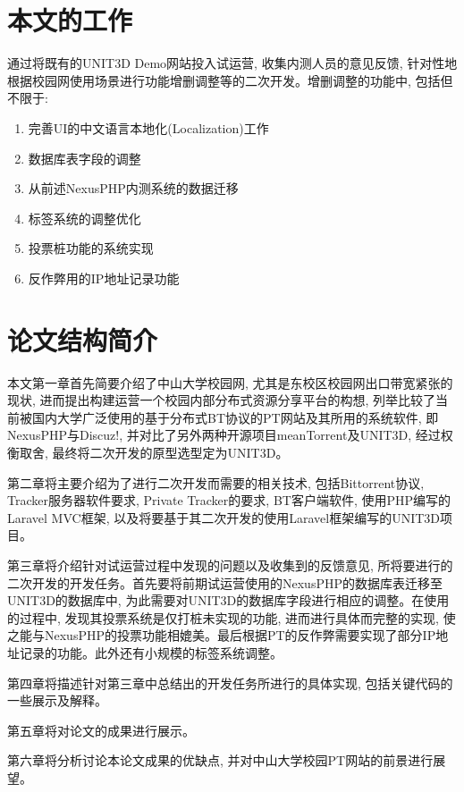\section{本文的工作}

通过将既有的UNIT3D Demo网站投入试运营, 收集内测人员的意见反馈, 针对性地根据校园网使用场景进行功能增删调整等的二次开发。增删调整的功能中, 包括但不限于:

\begin{enumerate}[label=\arabic*.,leftmargin=*]
\item 完善UI的中文语言本地化(Localization)工作
\item 数据库表字段的调整
\item 从前述NexusPHP内测系统的数据迁移
\item 标签系统的调整优化
\item 投票桩功能的系统实现
\item 反作弊用的IP地址记录功能
\end{enumerate}


\section{论文结构简介}

\label{sec:arrangement}
本文第一章首先简要介绍了中山大学校园网, 尤其是东校区校园网出口带宽紧张的现状, 进而提出构建运营一个校园内部分布式资源分享平台的构想, 列举比较了当前被国内大学广泛使用的基于分布式BT协议的PT网站及其所用的系统软件, 即NexusPHP与Discuz!, 并对比了另外两种开源项目meanTorrent及UNIT3D, 经过权衡取舍, 最终将二次开发的原型选型定为UNIT3D。

第二章将主要介绍为了进行二次开发而需要的相关技术, 包括Bittorrent协议, Trac\-ker服务器软件要求, Private Tracker的要求, BT客户端软件, 使用PHP编写的Laravel MVC框架, 以及将要基于其二次开发的使用Laravel框架编写的UNIT3D项目。

第三章将介绍针对试运营过程中发现的问题以及收集到的反馈意见, 所将要进行的二次开发的开发任务。首先要将前期试运营使用的NexusPHP的数据库表迁移至UNIT3D的数据库中, 为此需要对UNIT3D的数据库字段进行相应的调整。在使用的过程中, 发现其投票系统是仅打桩未实现的功能, 进而进行具体而完整的实现, 使之能与NexusPHP的投票功能相媲美。最后根据PT的反作弊需要实现了部分IP地址记录的功能。此外还有小规模的标签系统调整。

第四章将描述针对第三章中总结出的开发任务所进行的具体实现, 包括关键代码的一些展示及解释。

第五章将对论文的成果进行展示。

第六章将分析讨论本论文成果的优缺点, 并对中山大学校园PT网站的前景进行展望。


